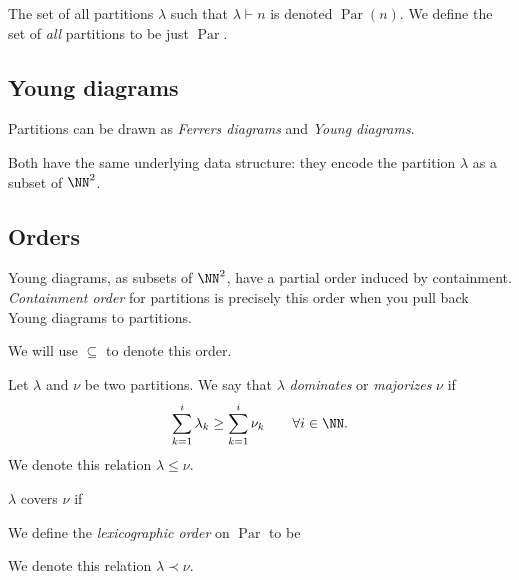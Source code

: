 \documentclass{article}
\DeclareMathOperator{\Par}{Par}
\begin{document}
The set of all partitions $\lambda$ such that $\lambda \vdash n$ is denoted $\Par(n)$. We define the set of \textit{all} partitions to be just $\Par$.

\subsection{Young diagrams}
Partitions can be drawn as \textit{Ferrers diagrams} and \textit{Young diagrams}. 

Both have the same underlying data structure: they encode the partition $\lambda$ as a subset of $\NN^2$.

\subsection{Orders}

\begin{definition}
    Young diagrams, as subsets of $\NN^2$, have a partial order induced by containment. 
    \textit{Containment order} for partitions is precisely this order when you pull back Young diagrams to partitions.

    We will use $\subseteq$ to denote this order.
\end{definition}

\begin{definition}
    Let $\lambda$ and $\nu$ be two partitions. We say that $\lambda$ \textit{dominates} or \textit{majorizes} $\nu$ if
    \[
        \sum_{k=1}^i \lambda_k \geq \sum_{k=1}^i \nu_k \qquad \forall i\in\NN.
    \]
    We denote this relation $\lambda \leq \nu$.
\end{definition}

\begin{theorem}
    $\lambda$ covers $\nu$ if
\end{theorem}

\begin{definition}
    We define the \textit{lexicographic order} on $\Par$ to be

    We denote this relation $\lambda \prec \nu$.
\end{definition}

\begin{theorem}
\end{theorem}

\begin{theorem}
\end{theorem}
\end{document}
